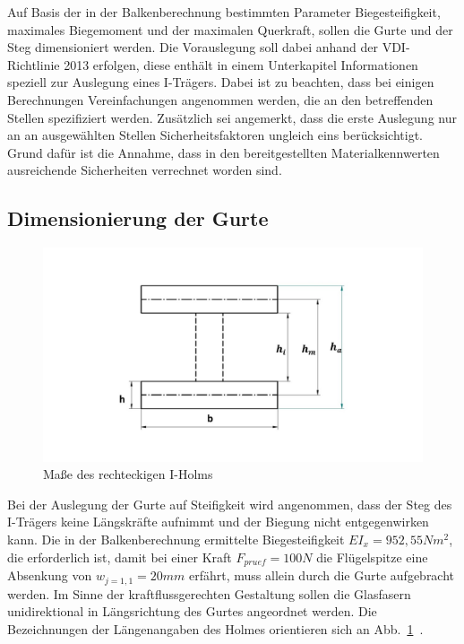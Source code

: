 
Auf Basis der in der Balkenberechnung bestimmten Parameter Biegesteifigkeit, maximales Biegemoment und der maximalen Querkraft, sollen die Gurte und der Steg dimensioniert werden. Die Vorauslegung soll dabei anhand der VDI- Richtlinie 2013 erfolgen, diese enthält in einem Unterkapitel Informationen speziell zur Auslegung eines I-Trägers. Dabei ist zu beachten, dass bei einigen Berechnungen Vereinfachungen angenommen werden, die an den betreffenden Stellen spezifiziert werden. Zusätzlich sei angemerkt, dass die erste Auslegung nur an an ausgewählten Stellen Sicherheitsfaktoren ungleich eins berücksichtigt. Grund dafür ist die Annahme, dass in den bereitgestellten Materialkennwerten ausreichende Sicherheiten verrechnet worden sind.

\subsection{Dimensionierung der Gurte}
\begin{figure}
	\includegraphics[width=1.0\textwidth]{Bilder/RechteckHolm.jpg}
	\caption{Maße des rechteckigen I-Holms}
	\label{fig: Rechteckholm}
\end{figure}

Bei der Auslegung der Gurte auf Steifigkeit wird angenommen, dass der Steg des I-Trägers keine Längskräfte aufnimmt und der Biegung nicht entgegenwirken kann. Die in der Balkenberechnung ermittelte Biegesteifigkeit $ EI_{x} = 952,55 Nm^{2} $, die erforderlich ist, damit bei einer Kraft $ F_{pruef}=100N $ die Flügelspitze eine Absenkung von $ w_{j=1,1}=20mm $ erfährt, muss allein durch die Gurte aufgebracht werden. Im Sinne der kraftflussgerechten Gestaltung sollen die Glasfasern unidirektional in Längsrichtung des Gurtes angeordnet werden. Die Bezeichnungen der Längenangaben des Holmes orientieren sich an Abb.~\ref{fig: Rechteckholm}~.\\



